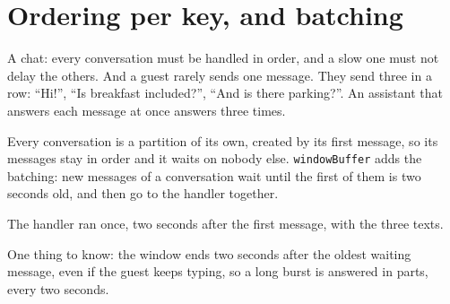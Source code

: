 %

\section{Ordering per key, and batching}

A chat: every conversation must be handled in order, and a slow one must not delay the others. And
a guest rarely sends one message. They send three in a row: ``Hi!'', ``Is breakfast included?'',
``And is there parking?''. An assistant that answers each message at once answers three times.

Every conversation is a partition of its own, created by its first message, so its messages stay in
order and it waits on nobody else. \texttt{windowBuffer} adds the batching: new messages of a
conversation wait until the first of them is two seconds old, and then go to the handler together.



The handler ran once, two seconds after the first message, with the three texts.


One thing to know: the window ends two seconds after the oldest waiting message, even if the guest
keeps typing, so a long burst is answered in parts, every two seconds.
